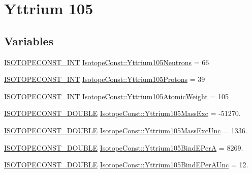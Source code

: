 \hypertarget{group___isotope_const-_yttrium-_y105}{}\section{Yttrium 105}
\label{group___isotope_const-_yttrium-_y105}
\subsection*{Variables}
\begin{DoxyCompactItemize}
\item 
\mbox{\hyperlink{group___isotope_const-_macros_ga5f18360b3e99483a35c32d789e62621c}{I\+S\+O\+T\+O\+P\+E\+C\+O\+N\+S\+T\+\_\+\+I\+NT}} \mbox{\hyperlink{group___isotope_const-_yttrium-_y105_gaede6cfff914f85f6df99a9271c6aea81}{Isotope\+Const\+::\+Yttrium105\+Neutrons}} = 66
\item 
\mbox{\hyperlink{group___isotope_const-_macros_ga5f18360b3e99483a35c32d789e62621c}{I\+S\+O\+T\+O\+P\+E\+C\+O\+N\+S\+T\+\_\+\+I\+NT}} \mbox{\hyperlink{group___isotope_const-_yttrium-_y105_gae5b9381e10b9e6ffd08252db6966f852}{Isotope\+Const\+::\+Yttrium105\+Protons}} = 39
\item 
\mbox{\hyperlink{group___isotope_const-_macros_ga5f18360b3e99483a35c32d789e62621c}{I\+S\+O\+T\+O\+P\+E\+C\+O\+N\+S\+T\+\_\+\+I\+NT}} \mbox{\hyperlink{group___isotope_const-_yttrium-_y105_ga41fd3de1f986faf565423ec02a608d8a}{Isotope\+Const\+::\+Yttrium105\+Atomic\+Weight}} = 105
\item 
\mbox{\hyperlink{group___isotope_const-_macros_ga8f45a7272ce02c0b4c65c44636ed719a}{I\+S\+O\+T\+O\+P\+E\+C\+O\+N\+S\+T\+\_\+\+D\+O\+U\+B\+LE}} \mbox{\hyperlink{group___isotope_const-_yttrium-_y105_ga0a3a24ea4659483e68917f47fb837421}{Isotope\+Const\+::\+Yttrium105\+Mass\+Exc}} = -\/51270.
\item 
\mbox{\hyperlink{group___isotope_const-_macros_ga8f45a7272ce02c0b4c65c44636ed719a}{I\+S\+O\+T\+O\+P\+E\+C\+O\+N\+S\+T\+\_\+\+D\+O\+U\+B\+LE}} \mbox{\hyperlink{group___isotope_const-_yttrium-_y105_gad5e8e36e63bd3be68687119e122a2b6a}{Isotope\+Const\+::\+Yttrium105\+Mass\+Exc\+Unc}} = 1336.
\item 
\mbox{\hyperlink{group___isotope_const-_macros_ga8f45a7272ce02c0b4c65c44636ed719a}{I\+S\+O\+T\+O\+P\+E\+C\+O\+N\+S\+T\+\_\+\+D\+O\+U\+B\+LE}} \mbox{\hyperlink{group___isotope_const-_yttrium-_y105_gad74e1e82f785c843b49955d608df3a85}{Isotope\+Const\+::\+Yttrium105\+Bind\+E\+PerA}} = 8269.
\item 
\mbox{\hyperlink{group___isotope_const-_macros_ga8f45a7272ce02c0b4c65c44636ed719a}{I\+S\+O\+T\+O\+P\+E\+C\+O\+N\+S\+T\+\_\+\+D\+O\+U\+B\+LE}} \mbox{\hyperlink{group___isotope_const-_yttrium-_y105_ga7e1eb243dbd8abba5d36d969816fd478}{Isotope\+Const\+::\+Yttrium105\+Bind\+E\+Per\+A\+Unc}} = 12.

\end{DoxyCompactItemize}

